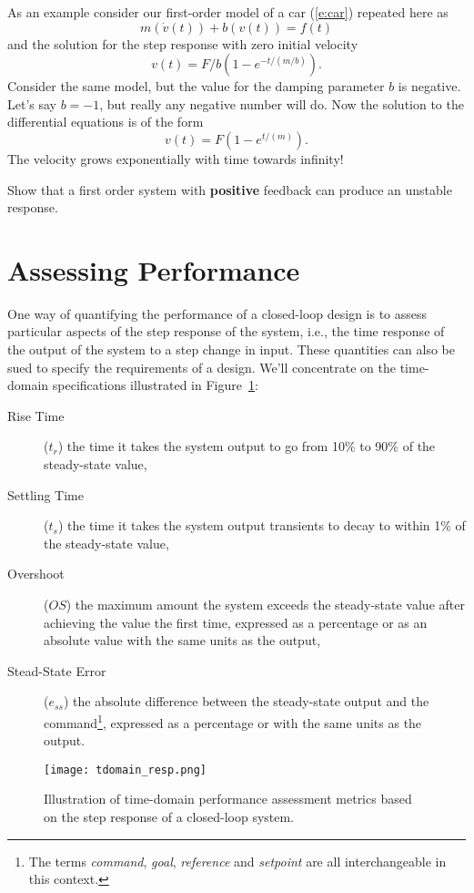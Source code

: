 As an example consider our first-order model of a car (\ref{e:car}) repeated here as
\[
m\left(\dot{v}(t)\right) + b(v(t)) = f(t)
\]
and the solution for the step response with zero initial velocity
\[
v(t) = F/b \left(1-e^{-t/(m/b)} \right).
\]
Consider the same model, but the value for the damping parameter $b$ is negative.  Let's say $b=-1$, but really any negative number will do.  Now the solution to the differential equations is of the form
\[
v(t) = F \left(1-e^{t/(m)} \right).
\]
The velocity grows exponentially with time towards infinity!

\begin{ex}
Show that a first order system with {\bf positive} feedback can produce an unstable response.
\end{ex}

\section{Assessing Performance}
One way of quantifying the performance of a closed-loop design is to assess particular aspects of the step response of the system, i.e., the time response of the output of the system to a step change in input.  These quantities can also be sued to specify the requirements of a design.  We'll concentrate on the time-domain specifications illustrated in Figure~\ref{f:tdomain_resp}:
\begin{description}
\item[Rise Time] ($t_r$) the time it takes the system output to go from 10\% to 90\% of the steady-state value,
\item[Settling Time] ($t_s$) the time it takes the system output transients to decay to within 1\% of the steady-state value,
\item[Overshoot] ($OS$) the maximum amount the system exceeds the steady-state value after achieving the value the first time, expressed as a percentage or as an absolute value with the same units as the output,
\item[Stead-State Error] ($e_{ss}$) the absolute difference between the steady-state output and the command\footnote{The terms \emph{command}, \emph{goal}, \emph{reference} and \emph{setpoint} are all interchangeable in this context.}, expressed as a percentage or with the same units as the output.
\end{description}
\begin{figure}[hbt]
\centering
\texttt{[image: tdomain\_resp.png]}
\caption{Illustration of time-domain performance assessment metrics based on the step response of a closed-loop system.}
\label{f:tdomain_resp}
\end{figure}


